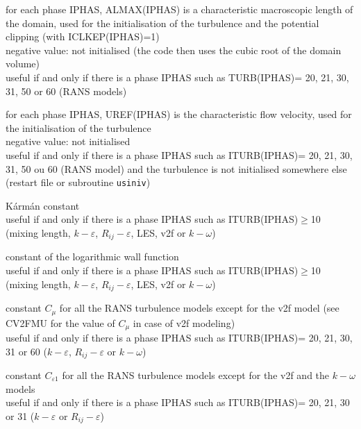 {for each phase IPHAS, ALMAX(IPHAS) is a characteristic macroscopic
length of the domain, used for the initialisation of the turbulence and
the potential clipping (with ICLKEP(IPHAS)=1)\\ 
negative value: not initialised (the code then uses the cubic root of
the domain volume)\\
useful if and only if there is a phase IPHAS such as 
TURB(IPHAS)= 20, 21, 30, 31, 50 or 60 (RANS models)}

{for each phase IPHAS, UREF(IPHAS) is the characteristic flow velocity,
used for the initialisation of the turbulence\\
negative value: not initialised\\
useful if and only if there is a phase IPHAS such as
ITURB(IPHAS)= 20, 21, 30, 31, 50 ou 60 (RANS model)
and the turbulence is not initialised somewhere
else (restart file or subroutine \texttt{usiniv})}



{K\'arm\'an constant\\
useful if and only if there is a phase IPHAS such as ITURB(IPHAS)$\geqslant$10 
(mixing length, $k-\varepsilon$, $R_{ij}-\varepsilon$, LES, v2f or $k-\omega$)}

{constant of the logarithmic wall function\\ 
useful if and only if there is a phase IPHAS such as ITURB(IPHAS)$\geqslant$10 
(mixing length, $k-\varepsilon$, $R_{ij}-\varepsilon$, LES, v2f or $k-\omega$)}

{constant $C_\mu$ for all the RANS turbulence models except for the v2f model
(see CV2FMU for the value of $C_\mu$ in case of v2f modeling)\\
useful if and only if there is a phase IPHAS such as ITURB(IPHAS)= 20,
21, 30, 31 or 60 ($k-\varepsilon$, $R_{ij}-\varepsilon$ or $k-\omega$)}

{constant $C_{\varepsilon 1}$ for all the RANS turbulence models except
for the v2f and the $k-\omega$ models\\
useful if and only if there is a phase IPHAS such as ITURB(IPHAS)= 20,
21, 30 or 31 ($k-\varepsilon$ or $R_{ij}-\varepsilon$)}

